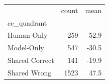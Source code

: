 \begin{tabular}{lrr}
\toprule
 & count & mean \\
cc_quadrant &  &  \\
\midrule
Human-Only & 259 & 52.9 \\
Model-Only & 547 & -30.5 \\
Shared Correct & 141 & -19.9 \\
Shared Wrong & 1523 & 47.5 \\
\bottomrule
\end{tabular}
